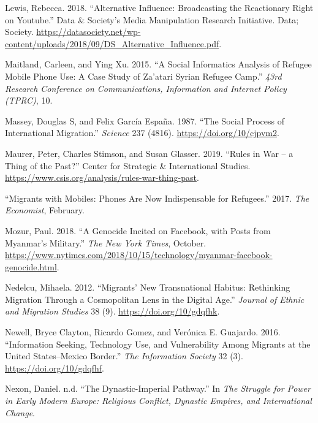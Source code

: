 \begin{cslreferences}
\leavevmode\hypertarget{ref-Lewis2018Alternative}{}%
Lewis, Rebecca. 2018. ``Alternative Influence: Broadcasting the
Reactionary Right on Youtube.'' Data \& Society's Media Manipulation
Research Initiative. Data; Society.
\url{https://datasociety.net/wp-content/uploads/2018/09/DS_Alternative_Influence.pdf}.

\leavevmode\hypertarget{ref-Maitland2015Social}{}%
Maitland, Carleen, and Ying Xu. 2015. ``A Social Informatics Analysis of
Refugee Mobile Phone Use: A Case Study of Za'atari Syrian Refugee
Camp.'' \emph{43rd Research Conference on Communications, Information
and Internet Policy (TPRC)}, 10.

\leavevmode\hypertarget{ref-Massey1987social}{}%
Massey, Douglas S, and Felix García España. 1987. ``The Social Process
of International Migration.'' \emph{Science} 237 (4816).
\url{https://doi.org/10/cjpvm2}.

\leavevmode\hypertarget{ref-PeterMaurer2019Rules}{}%
Maurer, Peter, Charles Stimson, and Susan Glasser. 2019. ``Rules in War
-- a Thing of the Past?'' Center for Strategic \& International Studies.
\url{https://www.csis.org/analysis/rules-war-thing-past}.

\leavevmode\hypertarget{ref-2017Migrants}{}%
``Migrants with Mobiles: Phones Are Now Indispensable for Refugees.''
2017. \emph{The Economist}, February.

\leavevmode\hypertarget{ref-Mozur2018Genocide}{}%
Mozur, Paul. 2018. ``A Genocide Incited on Facebook, with Posts from
Myanmar's Military.'' \emph{The New York Times}, October.
\url{https://www.nytimes.com/2018/10/15/technology/myanmar-facebook-genocide.html}.

\leavevmode\hypertarget{ref-Nedelcu2012Migrants}{}%
Nedelcu, Mihaela. 2012. ``Migrants' New Transnational Habitus:
Rethinking Migration Through a Cosmopolitan Lens in the Digital Age.''
\emph{Journal of Ethnic and Migration Studies} 38 (9).
\url{https://doi.org/10/gdqfhk}.

\leavevmode\hypertarget{ref-Newell2016Information}{}%
Newell, Bryce Clayton, Ricardo Gomez, and Verónica E. Guajardo. 2016.
``Information Seeking, Technology Use, and Vulnerability Among Migrants
at the United States--Mexico Border.'' \emph{The Information Society} 32
(3). \url{https://doi.org/10/gdqfhf}.

\leavevmode\hypertarget{ref-NexonDynastic-Imperial}{}%
Nexon, Daniel. n.d. ``The Dynastic-Imperial Pathway.'' In \emph{The
Struggle for Power in Early Modern Europe: Religious Conflict, Dynastic
Empires, and International Change}.


\end{cslreferences}
